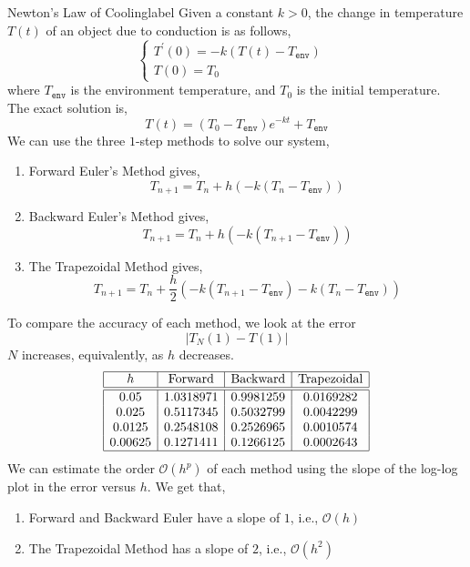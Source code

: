 \begin{ex}{Newton's Law of Cooling}{label}
	Given a constant $k > 0$, the change in temperature $T(t)$ of an object due to conduction is as follows,
	\[
	\begin{cases}
		T^{\prime}(0) = -k(T(t) - T_{\texttt{env}}) & \\
		T(0) = T_0
	\end{cases}
	\]
	where $T_{\texttt{env}}$ is the environment temperature, and $T_0$ is the initial temperature. The exact solution is,
	\[T(t) = (T_0 - T_{\texttt{env}})e^{-kt} + T_{\texttt{env}}\]
	We can use the three $1$-step methods to solve our system,
	\begin{enumerate}
	\item Forward Euler's Method gives,
	\[T_{n+1}=T_n+h\left(-k\left(T_n-T_{\texttt{env}}\right)\right)\]
	\item Backward Euler's Method gives,
	\[T_{n+1}=T_n+h\left(-k\left(T_{n+1}-T_{\texttt{env}}\right)\right)\]
	\item The Trapezoidal Method gives,
	\[T_{n+1}=T_n+\frac{h}{2}\left(-k\left(T_{n+1}-T_{\texttt{env}}\right)-k\left(T_n-T_{\texttt{env}}\right)\right)\]
	\end{enumerate}
	To compare the accuracy of each method, we look at the error
	\[|T_N(1) - T(1)|\]
	$N$ increases, equivalently, as $h$ decreases.
	\[
	\begin{array}{|c|c|c|c|}
	\hline h & \text {Forward} & \text {Backward} & \text{Trapezoidal} \\
	\hline \hline 0.05 & 1.0318971 & 0.9981259 & 0.0169282 \\
	0.025 & 0.5117345 & 0.5032799 & 0.0042299 \\
	0.0125 & 0.2548108 & 0.2526965 & 0.0010574 \\
	0.00625 & 0.1271411 & 0.1266125 & 0.0002643 \\
	\hline
	\end{array}
	\]
	We can estimate the order $\mathcal{O}\left(h^p\right)$ of each method using the slope of the log-log plot in the error versus $h$. We get that,
	\begin{enumerate}
		\item Forward and Backward Euler have a slope of $1$, i.e., $\mathcal{O}(h)$
		\item The Trapezoidal Method has a slope of $2$, i.e., $\mathcal{O}(h^2)$
	\end{enumerate}
\end{ex}

